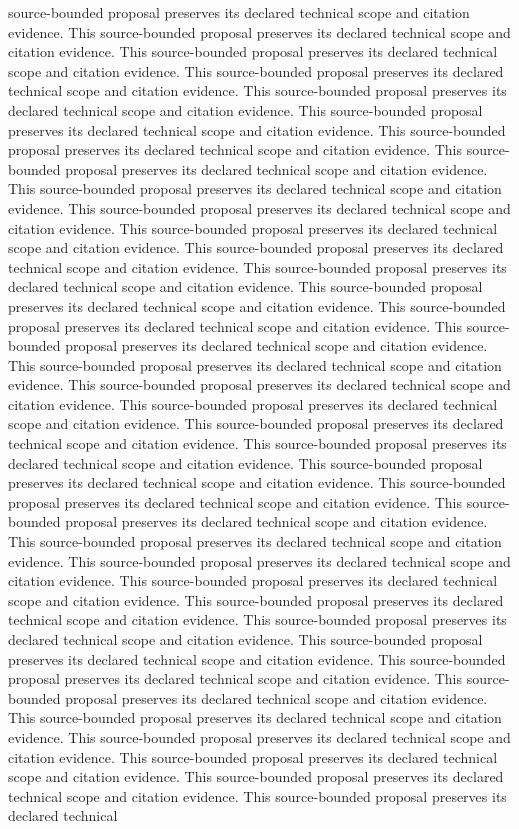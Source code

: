 \documentclass{article}
\begin{document}
source-bounded proposal preserves its declared technical scope and citation evidence. This source-bounded proposal preserves its declared technical scope and citation evidence. This source-bounded proposal preserves its declared technical scope and citation evidence. This source-bounded proposal preserves its declared technical scope and citation evidence. This source-bounded proposal preserves its declared technical scope and citation evidence. This source-bounded proposal preserves its declared technical scope and citation evidence. This source-bounded proposal preserves its declared technical scope and citation evidence. This source-bounded proposal preserves its declared technical scope and citation evidence. This source-bounded proposal preserves its declared technical scope and citation evidence. This source-bounded proposal preserves its declared technical scope and citation evidence. This source-bounded proposal preserves its declared technical scope and citation evidence. This source-bounded proposal preserves its declared technical scope and citation evidence. This source-bounded proposal preserves its declared technical scope and citation evidence. This source-bounded proposal preserves its declared technical scope and citation evidence. This source-bounded proposal preserves its declared technical scope and citation evidence. This source-bounded proposal preserves its declared technical scope and citation evidence. This source-bounded proposal preserves its declared technical scope and citation evidence. This source-bounded proposal preserves its declared technical scope and citation evidence. This source-bounded proposal preserves its declared technical scope and citation evidence. This source-bounded proposal preserves its declared technical scope and citation evidence. This source-bounded proposal preserves its declared technical scope and citation evidence. This source-bounded proposal preserves its declared technical scope and citation evidence. This source-bounded proposal preserves its declared technical scope and citation evidence. This source-bounded proposal preserves its declared technical scope and citation evidence. This source-bounded proposal preserves its declared technical scope and citation evidence. This source-bounded proposal preserves its declared technical scope and citation evidence. This source-bounded proposal preserves its declared technical scope and citation evidence. This source-bounded proposal preserves its declared technical scope and citation evidence. This source-bounded proposal preserves its declared technical scope and citation evidence. This source-bounded proposal preserves its declared technical scope and citation evidence. This source-bounded proposal preserves its declared technical scope and citation evidence. This source-bounded proposal preserves its declared technical scope and citation evidence. This source-bounded proposal preserves its declared technical scope and citation evidence. This source-bounded proposal preserves its declared technical scope and citation evidence. This source-bounded proposal preserves its declared technical scope and citation evidence. This source-bounded proposal preserves its declared technical scope and citation evidence. This source-bounded proposal preserves its declared technical 
\end{document}
